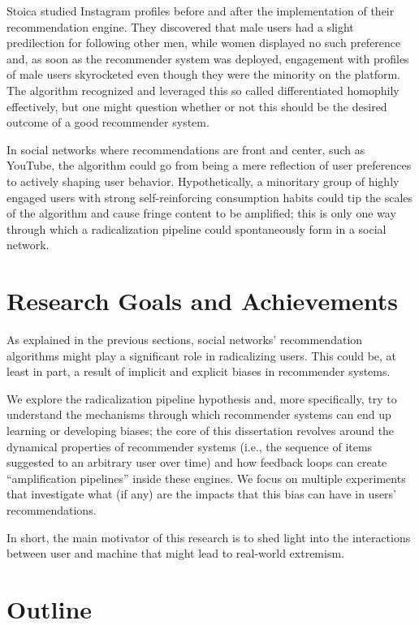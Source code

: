 Stoica \citep{stoica_algorithmic_2018} studied Instagram profiles before and
after the implementation of their recommendation engine. They discovered that
male users had a slight predilection for following other men, while women
displayed no such preference and, as soon as the recommender system was
deployed, engagement with profiles of male users skyrocketed even though they
were the minority on the platform. The algorithm recognized and leveraged this
so called differentiated homophily effectively, but one might question whether
or not this should be the desired outcome of a good recommender system.

In social networks where recommendations are front and center, such as YouTube,
the algorithm could go from being a mere reflection of user preferences to
actively shaping user behavior. Hypothetically, a minoritary group of highly
engaged users with strong self-reinforcing consumption habits could tip the
scales of the algorithm and cause fringe content to be amplified; this is only
one way through which a radicalization pipeline could spontaneously form in a
social network.

\section{Research Goals and Achievements}
\label{sec:research_goals}

As explained in the previous sections, social networks' recommendation
algorithms might play a significant role in radicalizing users. This could be,
at least in part, a result of implicit and explicit biases in recommender
systems.

We explore the radicalization pipeline hypothesis and, more specifically, try to
understand the mechanisms through which recommender systems can end up learning
or developing biases; the core of this dissertation revolves around the
dynamical properties of recommender systems (i.e., the sequence of items
suggested to an arbitrary user over time) and how feedback loops can create
``amplification pipelines'' inside these engines. We focus on multiple
experiments that investigate what (if any) are the impacts that this bias can
have in users' recommendations.

In short, the main motivator of this research is to shed light into the
interactions between user and machine that might lead to real-world extremism.

\section{Outline}
\label{sec:outline}

